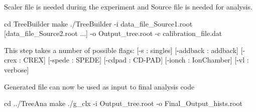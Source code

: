 Scaler file is needed during the experiment and Source file is needed for analysis.


\begin{DoxyCode}
cd TreeBuilder
make
./TreeBuilder -i data\_file\_Source1.root [data\_file\_Source2.root ...] -o Output\_tree.root -c
       calibration\_file.dat
\end{DoxyCode}
 This step takes a number of possible flags\+: \mbox{[}-\/s \+: singles\mbox{]} \mbox{[}-\/addback \+: addback\mbox{]} \mbox{[}-\/crex \+: C\+R\+EX\mbox{]} \mbox{[}-\/spede \+: S\+P\+E\+DE\mbox{]} \mbox{[}-\/cdpad \+: C\+D-\/\+P\+AD\mbox{]} \mbox{[}-\/ionch \+: Ion\+Chamber\mbox{]} \mbox{[}-\/vl \+: verbose\mbox{]}

Generated file can now be used as input to final analysis code


\begin{DoxyCode}
cd ../TreeAna
make
./g\_clx -i Output\_tree.root -o Final\_Output\_hists.root
\end{DoxyCode}
 